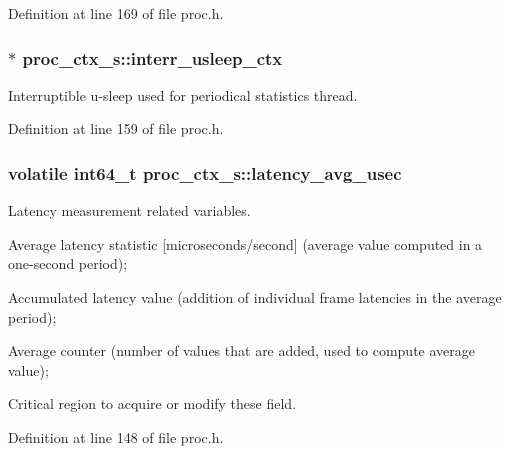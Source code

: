 Definition at line 169 of file proc.\+h.

\subsubsection[{\texorpdfstring{interr\+\_\+usleep\+\_\+ctx}{interr_usleep_ctx}}]{$\ast$ proc\+\_\+ctx\+\_\+s\+::interr\+\_\+usleep\+\_\+ctx}\hypertarget{structproc__ctx__s_ae60a995d574f7f3e1719439b77ea02f9}{}\label{structproc__ctx__s_ae60a995d574f7f3e1719439b77ea02f9}
Interruptible u-\/sleep used for periodical statistics thread. 

Definition at line 159 of file proc.\+h.

\subsubsection[{\texorpdfstring{latency\+\_\+avg\+\_\+usec}{latency_avg_usec}}]{\setlength{\rightskip}{0pt plus 5cm}volatile int64\+\_\+t proc\+\_\+ctx\+\_\+s\+::latency\+\_\+avg\+\_\+usec}\hypertarget{structproc__ctx__s_acdd3cc73dadcf7eb7c70c6e5ffb53293}{}\label{structproc__ctx__s_acdd3cc73dadcf7eb7c70c6e5ffb53293}
Latency measurement related variables.
\begin{DoxyItemize}
\item Average latency statistic \mbox{[}microseconds/second\mbox{]} (average value computed in a one-\/second period);
\item Accumulated latency value (addition of individual frame latencies in the average period);
\item Average counter (number of values that are added, used to compute average value);
\item Critical region to acquire or modify these field. 
\end{DoxyItemize}

Definition at line 148 of file proc.\+h.

